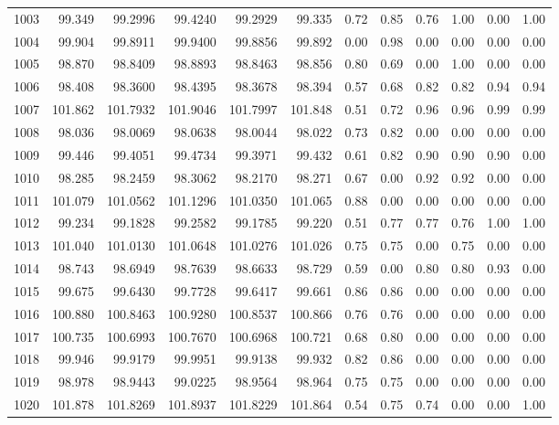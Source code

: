 \begin{table}[p]
\begin{tabular}{@{}rrrrrr|rr|rrrr@{}}
1003 & 99.349 & 99.2996 & 99.4240 & 99.2929 & 99.335 & 0.72 & 0.85 & 0.76 & 1.00 & 0.00 & 1.00 \\
1004 & 99.904 & 99.8911 & 99.9400 & 99.8856 & 99.892 & 0.00 & 0.98 & 0.00 & 0.00 & 0.00 & 0.00 \\
1005 & 98.870 & 98.8409 & 98.8893 & 98.8463 & 98.856 & 0.80 & 0.69 & 0.00 & 1.00 & 0.00 & 0.00 \\
1006 & 98.408 & 98.3600 & 98.4395 & 98.3678 & 98.394 & 0.57 & 0.68 & 0.82 & 0.82 & 0.94 & 0.94 \\
1007 & 101.862 & 101.7932 & 101.9046 & 101.7997 & 101.848 & 0.51 & 0.72 & 0.96 & 0.96 & 0.99 & 0.99 \\
1008 & 98.036 & 98.0069 & 98.0638 & 98.0044 & 98.022 & 0.73 & 0.82 & 0.00 & 0.00 & 0.00 & 0.00 \\
1009 & 99.446 & 99.4051 & 99.4734 & 99.3971 & 99.432 & 0.61 & 0.82 & 0.90 & 0.90 & 0.90 & 0.00 \\
1010 & 98.285 & 98.2459 & 98.3062 & 98.2170 & 98.271 & 0.67 & 0.00 & 0.92 & 0.92 & 0.00 & 0.00 \\
1011 & 101.079 & 101.0562 & 101.1296 & 101.0350 & 101.065 & 0.88 & 0.00 & 0.00 & 0.00 & 0.00 & 0.00 \\
1012 & 99.234 & 99.1828 & 99.2582 & 99.1785 & 99.220 & 0.51 & 0.77 & 0.77 & 0.76 & 1.00 & 1.00 \\
1013 & 101.040 & 101.0130 & 101.0648 & 101.0276 & 101.026 & 0.75 & 0.75 & 0.00 & 0.75 & 0.00 & 0.00 \\
1014 & 98.743 & 98.6949 & 98.7639 & 98.6633 & 98.729 & 0.59 & 0.00 & 0.80 & 0.80 & 0.93 & 0.00 \\
1015 & 99.675 & 99.6430 & 99.7728 & 99.6417 & 99.661 & 0.86 & 0.86 & 0.00 & 0.00 & 0.00 & 0.00 \\
1016 & 100.880 & 100.8463 & 100.9280 & 100.8537 & 100.866 & 0.76 & 0.76 & 0.00 & 0.00 & 0.00 & 0.00 \\
1017 & 100.735 & 100.6993 & 100.7670 & 100.6968 & 100.721 & 0.68 & 0.80 & 0.00 & 0.00 & 0.00 & 0.00 \\
1018 & 99.946 & 99.9179 & 99.9951 & 99.9138 & 99.932 & 0.82 & 0.86 & 0.00 & 0.00 & 0.00 & 0.00 \\
1019 & 98.978 & 98.9443 & 99.0225 & 98.9564 & 98.964 & 0.75 & 0.75 & 0.00 & 0.00 & 0.00 & 0.00 \\
1020 & 101.878 & 101.8269 & 101.8937 & 101.8229 & 101.864 & 0.54 & 0.75 & 0.74 & 0.00 & 0.00 & 1.00 \\
\bottomrule
\end{tabular}
\end{table}
